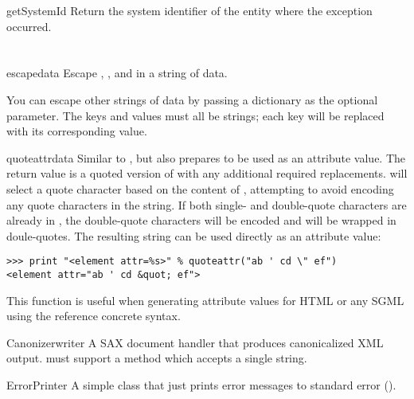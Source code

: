 \documentclass{howto}
\begin{document}
\begin{methoddesc}{getSystemId}{}
Return the system identifier of the entity where the exception occurred.
\end{methoddesc}


\section{}

\begin{funcdesc}{escape}{data}
  Escape \character{\&}, \character{<}, and \character{>} in a string
  of data.

  You can escape other strings of data by passing a dictionary as the
  optional  parameter.  The keys and values must all be
  strings; each key will be replaced with its corresponding value.
\end{funcdesc}

\begin{funcdesc}{quoteattr}{data}
  Similar to , but also prepares  to be
  used as an attribute value.  The return value is a quoted version of
   with any additional required replacements.
   will select a quote character based on the
  content of , attempting to avoid encoding any quote
  characters in the string.  If both single- and double-quote
  characters are already in , the double-quote characters
  will be encoded and  will be wrapped in doule-quotes.  The
  resulting string can be used directly as an attribute value:

\begin{verbatim}
>>> print "<element attr=%s>" % quoteattr("ab ' cd \" ef")
<element attr="ab ' cd &quot; ef">
\end{verbatim}

  This function is useful when generating attribute values for HTML or
  any SGML using the reference concrete syntax.
\end{funcdesc}

\begin{classdesc}{Canonizer}{writer}
A SAX document handler that produces canonicalized XML output.
 must support a  method which accepts a
single string.  
\end{classdesc}

\begin{classdesc}{ErrorPrinter}{}
A simple class that just prints error messages to standard error
().
\end{classdesc}
\end{document}
